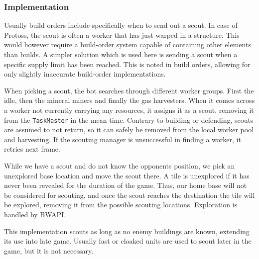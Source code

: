 		\subsubsection*{Implementation}
		Usually build orders include specifically when to send out a scout. In case of Protoss, the scout is often a worker that has just warped in a structure. This would however require a build-order system capable of containing other elements than builds. A simpler solution which is used here is sending a scout when a specific supply limit has been reached. This is noted in build orders, allowing for only slightly inaccurate build-order implementations.
		
		When picking a scout, the bot searches through different worker groups. First the idle, then the mineral miners and finally the gas harvesters. When it comes across a worker not currently carrying any resources, it assigns it as a scout, removing it from the \texttt{TaskMaster} in the mean time. Contrary to building or defending, scouts are assumed to not return, so it can safely be removed from the local worker pool and harvesting. If the scouting manager is unsuccessful in finding a worker, it retries next frame.
		
		While we have a scout and do not know the opponents position, we pick an unexplored base location and move the scout there. A tile is unexplored if it has never been revealed for the duration of the game. Thus, our home base will not be considered for scouting, and once the scout reaches the destination the tile will be explored, removing it from the possible scouting locations. Exploration is handled by BWAPI.
		
		This implementation scouts as long as no enemy buildings are known, extending its use into late game. Usually fast or cloaked units are used to scout later in the game, but it is not necessary.